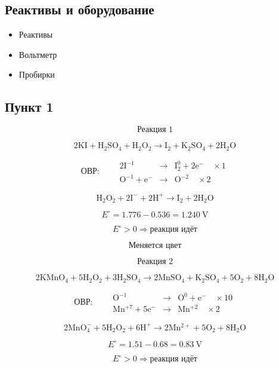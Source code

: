 \documentclass[a4paper, 12pt]{article}
\begin{document}
\subsection*{Реактивы и оборудование}

\begin{itemize}[label=--]
    \item Реактивы
    \item Вольтметр
    \item Пробирки
\end{itemize}

\subsection*{Пункт 1}

\[
    \boxed{\text{Реакция 1}}
\]

\[
    \mathrm{2KI + H_2SO_4 + H_2O_2 \rightarrow I_2 + K_2SO_4 + 2H_2O}
\]

\[
    \text{ОВР:}\qquad
    \begin{array}{rcl}
        \mathrm{2I^{-1}}      & \rightarrow & \mathrm{I_2^0 + 2e^-} \quad \times 1 \\
        \mathrm{O^{-1} + e^-} & \rightarrow & \mathrm{O^{-2}} \quad \times 2
    \end{array}
\]

\[
    \mathrm{H_2O_2 + 2I^- + 2H^+ \rightarrow I_2 + 2H_2O}
\]

\[
    E^\circ = 1.776 - 0.536 = 1.240\ \mathrm{V}
\]

\[
    \boxed{E^\circ > 0 \Rightarrow \text{реакция идёт}}
\]

\[
    \text{Меняется цвет}
\]

\[
    \boxed{\text{Реакция 2}}
\]

\[
    \mathrm{2KMnO_4 + 5H_2O_2 + 3H_2SO_4
        \rightarrow 2MnSO_4 + K_2SO_4 + 5O_2 + 8H_2O}
\]

\[
    \text{ОВР:}\qquad
    \begin{array}{rcl}
        \mathrm{O^{-1}}         & \rightarrow & \mathrm{O^0 + e^-} \quad \times 10 \\
        \mathrm{Mn^{+7} + 5e^-} & \rightarrow & \mathrm{Mn^{+2}} \quad \times 2
    \end{array}
\]

\[
    \mathrm{2MnO_4^- + 5H_2O_2 + 6H^+
        \rightarrow 2Mn^{2+} + 5O_2 + 8H_2O}
\]

\[
    E^\circ = 1.51 - 0.68 = 0.83\ \mathrm{V}
\]

\[
    \boxed{E^\circ > 0 \Rightarrow \text{реакция идёт}}
\]
\end{document}
